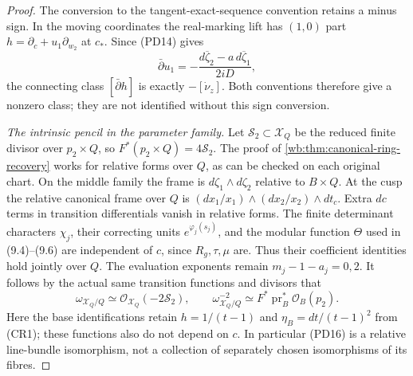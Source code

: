\begin{proof}
The conversion to the tangent-exact-sequence convention retains a
minus sign. In the moving coordinates the real-marking lift has
$(1,0)$ part $h=\partial_c+u_1\partial_{w_2}$ at $c_*$.
Since (PD14) gives
\[
 \bar\partial u_1=-\frac{d\overline\zeta_2-a\,d\overline\zeta_1}{2iD},
\]
the connecting class $[\bar\partial h]$ is exactly $-[\dot\nu_z]$.
Both conventions therefore give a nonzero class; they are not identified
without this sign conversion.

\emph{The intrinsic pencil in the parameter family.}
Let $\mathcal S_2\subset\mathcal X_Q$ be the reduced finite divisor
over $p_2\times Q$, so $F^*(p_2\times Q)=4\mathcal S_2$.
The proof of \cref{wb:thm:canonical-ring-recovery} works for relative
forms over $Q$, as can be checked on each original chart.
On the middle family the frame is $d\zeta_1\wedge d\zeta_2$ relative
to $B\times Q$. At the cusp the relative canonical frame over $Q$ is
$(dx_1/x_1)\wedge(dx_2/x_2)\wedge dt_c$.
Extra $dc$ terms in transition differentials vanish in relative forms.
The finite determinant characters $\chi_j$, their correcting units
$e^{\varphi_j(s_j)}$, and the modular function $\Theta$ used in
(9.4)--(9.6) are independent of $c$, since $R_g,\tau,\mu$ are.
Thus their coefficient identities hold jointly over $Q$.
The evaluation exponents remain $m_j-1-a_j=0,2$.
It follows by the actual same transition functions and divisors that
\[
 \omega_{\mathcal X_Q/Q}\simeq\mathcal O_{\mathcal X_Q}(-2\mathcal S_2),
 \qquad
 \omega_{\mathcal X_Q/Q}^{-2}\simeq
          F^*\operatorname{pr}_B^*\mathcal O_B(p_2).
 \tag{PD16}
\]
Here the base identifications retain $h=1/(t-1)$ and
$\eta_B=dt/(t-1)^2$ from (CR1); these functions also do not depend on $c$.
In particular (PD16) is a relative line-bundle isomorphism, not a
collection of separately chosen isomorphisms of its fibres.


\end{proof}
